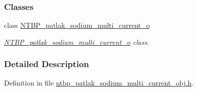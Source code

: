 \subsubsection*{Classes}
\begin{DoxyCompactItemize}
\item 
class \hyperlink{class_n_t_b_p__patlak__sodium__multi__current__o}{NTBP\_\-patlak\_\-sodium\_\-multi\_\-current\_\-o}
\begin{DoxyCompactList}\small\item\em \hyperlink{class_n_t_b_p__patlak__sodium__multi__current__o}{NTBP\_\-patlak\_\-sodium\_\-multi\_\-current\_\-o} class. \item\end{DoxyCompactList}\end{DoxyCompactItemize}


\subsubsection{Detailed Description}


Definition in file \hyperlink{ntbp__patlak__sodium__multi__current__obj_8h_source}{ntbp\_\-patlak\_\-sodium\_\-multi\_\-current\_\-obj.h}.

